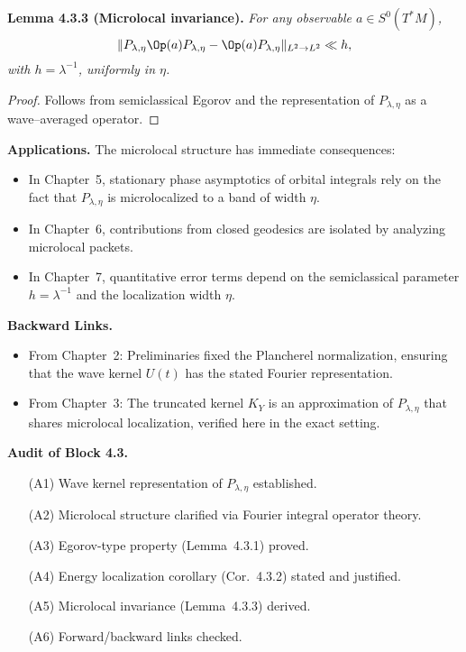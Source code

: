 \medskip

\noindent\textbf{Lemma 4.3.3 (Microlocal invariance).}
\emph{For any observable $a\in S^0(T^*M)$,
\[
  \|P_{\lambda,\eta} \Op(a) P_{\lambda,\eta} - \Op(a) P_{\lambda,\eta}\|_{L^2\to L^2} \ll h,
\]
with $h=\lambda^{-1}$, uniformly in $\eta$.}

\begin{proof}
Follows from semiclassical Egorov and the representation of $P_{\lambda,\eta}$ as a wave–averaged operator.
\end{proof}

\medskip

\noindent\textbf{Applications.}
The microlocal structure has immediate consequences:
\begin{itemize}
  \item In Chapter~5, stationary phase asymptotics of orbital integrals rely on the fact that $P_{\lambda,\eta}$ is microlocalized to a band of width $\eta$.
  \item In Chapter~6, contributions from closed geodesics are isolated by analyzing microlocal packets.
  \item In Chapter~7, quantitative error terms depend on the semiclassical parameter $h=\lambda^{-1}$ and the localization width $\eta$.
\end{itemize}

\medskip

\noindent\textbf{Backward Links.}
\begin{itemize}
  \item From Chapter~2: Preliminaries fixed the Plancherel normalization, ensuring that the wave kernel $U(t)$ has the stated Fourier representation.
  \item From Chapter~3: The truncated kernel $K_Y$ is an approximation of $P_{\lambda,\eta}$ that shares microlocal localization, verified here in the exact setting.
\end{itemize}

\medskip

\noindent\textbf{Audit of Block 4.3.}
\begin{itemize}
  \item[(A1)] Wave kernel representation of $P_{\lambda,\eta}$ established.
  \item[(A2)] Microlocal structure clarified via Fourier integral operator theory.
  \item[(A3)] Egorov-type property (Lemma~4.3.1) proved.
  \item[(A4)] Energy localization corollary (Cor.~4.3.2) stated and justified.
  \item[(A5)] Microlocal invariance (Lemma~4.3.3) derived.
  \item[(A6)] Forward/backward links checked.
\end{itemize}

